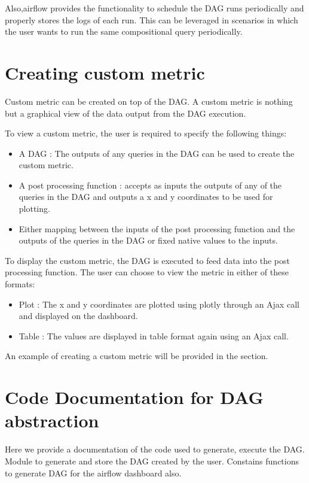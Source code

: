 \documentclass[letterpaper,10pt,english]{sphinxmanual}
\begin{document}
Also,airflow provides the functionality to schedule the DAG runs periodically and properly stores the logs of each run. This can be leveraged in scenarios in which the user wants to run the same compositional query periodically.


\section{Creating custom metric}
\label{\detokenize{dag:creating-custom-metric}}
Custom metric can be created on top of the DAG. A custom metric is nothing but a graphical view of the data output from the DAG execution.

To view a custom metric, the user is required to specify the following things:
\begin{itemize}
\item {} 
A DAG : The outputs of any queries in the DAG can be used to create the custom metric.

\item {} 
A post processing function : accepts as inputs the outputs of any of the queries in the DAG and outputs a x and y coordinates to be used for plotting.

\item {} 
Either mapping between the inputs of the post processing function and the outputs of the queries in the DAG or fixed native values to the inputs.

\end{itemize}

To display the custom metric, the DAG is executed to feed data into the post processing function. The user can choose to view the metric in either of these formats:
\begin{itemize}
\item {} 
Plot : The x and y coordinates are plotted using plotly through an Ajax call and displayed on the dashboard.

\item {} 
Table : The values are displayed in table format again using an Ajax call.

\end{itemize}

An example of creating a custom metric will be provided in the {\hyperref[\detokenize{dashboard_website:dashboard-website}]{}} section.


\section{Code Documentation for DAG abstraction}
\label{\detokenize{dag:code-documentation-for-dag-abstraction}}
Here we provide a documentation of the code used to generate, execute the DAG.
\label{\detokenize{dag:module-create_dag}}
Module to generate and store the DAG created by the user. Constains functions to generate DAG for the airflow
dashboard also.
\end{document}
